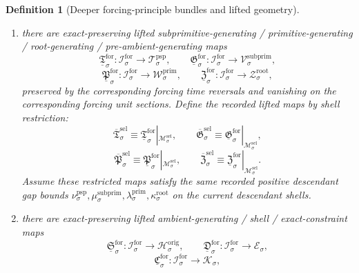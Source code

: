 \documentclass[11pt]{article}
\newcommand{\ShellTarget}[1]{\mathcal E_{#1}}
\newcommand{\ConstraintTarget}[1]{\mathcal K_{#1}}
\newcommand{\OriginTarget}[1]{\mathcal H_{#1}^{\mathrm{orig}}}
\newcommand{\RootTarget}[1]{\mathcal Z_{#1}^{\mathrm{root}}}
\newcommand{\RootGap}[1]{\kappa_{#1}^{\mathrm{root}}}
\newcommand{\PrimTarget}[1]{\mathcal W_{#1}^{\mathrm{prim}}}
\newcommand{\PrimGap}[1]{\lambda_{#1}^{\mathrm{prim}}}
\newcommand{\SubprimTarget}[1]{\mathcal V_{#1}^{\mathrm{subprim}}}
\newcommand{\SubprimGap}[1]{\mu_{#1}^{\mathrm{subprim}}}
\newcommand{\ProtoSubprimTarget}[1]{\mathcal T_{#1}^{\mathrm{psp}}}
\newcommand{\ProtoSubprimGap}[1]{\nu_{#1}^{\mathrm{psp}}}
\newcommand{\PreProtoSubprimGap}[1]{\omega_{#1}^{\mathrm{ppsp}}}
\newcommand{\SelSpace}[1]{\mathcal M_{#1}^{\mathrm{sel}}}
\newcommand{\SelLiftedPreProto}[1]{\overline{\mathfrak U}_{#1}^{\mathrm{sel}}}
\newcommand{\SelLiftedSubprimitive}[1]{\overline{\mathfrak T}_{#1}^{\mathrm{sel}}}
\newcommand{\SelLiftedPrimitive}[1]{\overline{\mathfrak G}_{#1}^{\mathrm{sel}}}
\newcommand{\SelLiftedRoot}[1]{\overline{\mathfrak P}_{#1}^{\mathrm{sel}}}
\newcommand{\SelLiftedPreAmbient}[1]{\overline{\mathfrak Z}_{#1}^{\mathrm{sel}}}
\newcommand{\ForSpace}[1]{\mathcal I_{#1}^{\mathrm{for}}}
\newcommand{\ForLiftedPreProto}[1]{\underline{\mathfrak U}_{#1}^{\mathrm{for}}}
\newcommand{\ForLiftedSubprimitive}[1]{\underline{\mathfrak T}_{#1}^{\mathrm{for}}}
\newcommand{\ForLiftedPrimitive}[1]{\underline{\mathfrak G}_{#1}^{\mathrm{for}}}
\newcommand{\ForLiftedRoot}[1]{\underline{\mathfrak P}_{#1}^{\mathrm{for}}}
\newcommand{\ForLiftedPreAmbient}[1]{\underline{\mathfrak Z}_{#1}^{\mathrm{for}}}
\newcommand{\ForLiftedAmbient}[1]{\underline{\mathfrak S}_{#1}^{\mathrm{for}}}
\newcommand{\ForLiftedShell}[1]{\underline{\mathfrak D}_{#1}^{\mathrm{for}}}
\newcommand{\ForConstraintMap}[1]{\underline{\mathfrak C}_{#1}^{\mathrm{for}}}
\newtheorem{definition}{Definition}
\begin{document}
\begin{definition}[Deeper forcing-principle bundles and lifted geometry]
\begin{enumerate}
\[    \]
    preserved by the corresponding forcing time reversals and vanishing on the corresponding forcing unit sections. Define the recorded lifted proto-subprimitive-generating maps by shell restriction:
    \begin{equation}
    \SelLiftedPreProto{\sigma}\equiv \ForLiftedPreProto{\sigma}|_{\SelSpace{\sigma}}.
    \label{eq:selection_preproto_from_forcing}
    \end{equation}
    Assume these restricted maps satisfy the same recorded positive pre-proto-subprimitive gap bounds \(\PreProtoSubprimGap{\sigma}>0\) on the current proto-subprimitive shells cut out inside \(\SelSpace{\sigma}\).
    \item there are exact-preserving lifted subprimitive-generating / primitive-generating / root-generating / pre-ambient-generating maps
    \[
    \ForLiftedSubprimitive{\sigma}:\ForSpace{\sigma}\to\ProtoSubprimTarget{\sigma},\qquad
    \ForLiftedPrimitive{\sigma}:\ForSpace{\sigma}\to\SubprimTarget{\sigma},
    \]
    \[
    \ForLiftedRoot{\sigma}:\ForSpace{\sigma}\to\PrimTarget{\sigma},\qquad
    \ForLiftedPreAmbient{\sigma}:\ForSpace{\sigma}\to\RootTarget{\sigma},
    \]
    preserved by the corresponding forcing time reversals and vanishing on the corresponding forcing unit sections. Define the recorded lifted maps by shell restriction:
    \begin{equation}
    \SelLiftedSubprimitive{\sigma}\equiv \ForLiftedSubprimitive{\sigma}|_{\SelSpace{\sigma}},\qquad
    \SelLiftedPrimitive{\sigma}\equiv \ForLiftedPrimitive{\sigma}|_{\SelSpace{\sigma}},
    \label{eq:selection_subprimitive_primitive_from_forcing}
    \end{equation}
    \begin{equation}
    \SelLiftedRoot{\sigma}\equiv \ForLiftedRoot{\sigma}|_{\SelSpace{\sigma}},\qquad
    \SelLiftedPreAmbient{\sigma}\equiv \ForLiftedPreAmbient{\sigma}|_{\SelSpace{\sigma}}.
    \label{eq:selection_root_preambient_from_forcing}
    \end{equation}
    Assume these restricted maps satisfy the same recorded positive descendant gap bounds \(\ProtoSubprimGap{\sigma},\SubprimGap{\sigma},\PrimGap{\sigma},\RootGap{\sigma}\) on the current descendant shells.
    \item there are exact-preserving lifted ambient-generating / shell / exact-constraint maps
    \[
    \ForLiftedAmbient{\sigma}:\ForSpace{\sigma}\to\OriginTarget{\sigma},\qquad
    \ForLiftedShell{\sigma}:\ForSpace{\sigma}\to\ShellTarget{\sigma},
    \]
    \[
    \ForConstraintMap{\sigma}:\ForSpace{\sigma}\to\ConstraintTarget{\sigma},
\]
\end{enumerate}
\end{definition}
\end{document}
